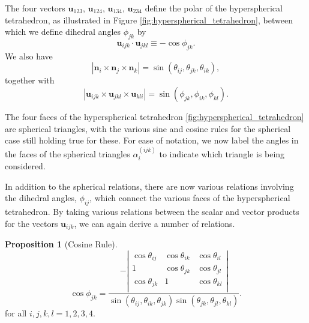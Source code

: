 \documentclass[fleqn,11pt,twoside]{article}
\theoremstyle{definition}
\newtheorem{prop}{Proposition}
\begin{document}
The four vectors $\mathbf{u}_{123}$, $\mathbf{u}_{124}$, $\mathbf{u}_{134}$, $\mathbf{u}_{234}$ define the polar of the hyperspherical tetrahedron, as illustrated in Figure \ref{fig:hyperspherical_tetrahedron}, between which we define dihedral angles $\phi_{jk}$ by
\begin{equation}
\textbf{u}_{ijk}\cdot\textbf{u}_{jkl}\equiv-\cos\phi_{jk}.
\end{equation}
We also have 
\begin{equation}
|\textbf{n}_i\times\textbf{n}_j\times\textbf{n}_k|=\sin(\theta_{ij},\theta_{jk},\theta_{ik}),
\end{equation}
together with
\begin{equation}
|\textbf{u}_{ijk}\times\textbf{u}_{jkl}\times\textbf{u}_{kli}|=\sin(\phi_{jk},\phi_{ik},\phi_{kl}).
\end{equation}


The four faces of the hyperspherical tetrahedron 
\ref{fig:hyperspherical_tetrahedron} 
are spherical triangles, with the various sine and cosine rules for the spherical case still holding true for these. For ease of notation, we now label the angles in the faces of the spherical triangles $\alpha_i^{(ijk)}$ to indicate which triangle is being considered.

In addition to the spherical relations, there are now various relations involving the dihedral angles, $\phi_{ij}$, which connect the various faces of the hyperspherical tetrahedron. By taking various relations between the scalar and vector products for the vectors $\textbf{u}_{ijk}$, we can again derive  a number of relations.
\begin{prop}[Cosine Rule]
\begin{equation}\label{eq:cosine}
\cos\phi_{jk}=\frac{-\left|\begin{array}{ccc}
\cos\theta_{ij} & \cos\theta_{ik} & \cos\theta_{il} \\
1 & \cos\theta_{jk} & \cos\theta_{jl} \\
\cos\theta_{jk} & 1 & \cos\theta_{kl} \\
\end{array}\right|}
{\sin(\theta_{ij},\theta_{ik},\theta_{jk})\sin(\theta_{jk},\theta_{jl},\theta_{kl})}.
\end{equation} for all $i,j,k,l=1,2,3,4$. 
\end{prop}
\end{document}
